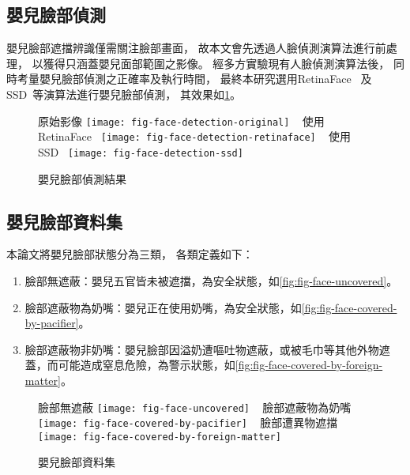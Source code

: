 \documentclass[class=NCU_thesis, crop=false]{standalone}
\begin{document}
\subsection{嬰兒臉部偵測}
嬰兒臉部遮擋辨識僅需關注臉部畫面，
故本文會先透過人臉偵測演算法進行前處理，
以獲得只涵蓋嬰兒面部範圍之影像。
經多方實驗現有人臉偵測演算法後，
同時考量嬰兒臉部偵測之正確率及執行時間，
最終本研究選用RetinaFace~\cite{deng_retinaface_2020}
及SSD~\cite{ye_face_2021}等演算法進行嬰兒臉部偵測，
其效果如\cref{fig:fig-face-detection}。
\begin{figure}[!hbt]
    \centering
    \subcaptionbox
        {原始影像
        \label{fig:fig-face-detection-original}}
        {\texttt{[image: fig-face-detection-original]}}
    ~
    \subcaptionbox
        {使用RetinaFace~\cite{deng_retinaface_2020}
        \label{fig:fig-face-detection-retinaface}}
        {\texttt{[image: fig-face-detection-retinaface]}}
    ~
    \subcaptionbox
        {使用SSD~\cite{ye_face_2021}
        \label{fig:fig-face-detection-ssd}}
        {\texttt{[image: fig-face-detection-ssd]}}
    \caption{嬰兒臉部偵測結果}
    \label{fig:fig-face-detection}
\end{figure}

\subsection{嬰兒臉部資料集}
本論文將嬰兒臉部狀態分為三類，
各類定義如下：
\begin{enumerate}
    \item 臉部無遮蔽：嬰兒五官皆未被遮擋，為安全狀態，如\cref{fig:fig-face-uncovered}。
    \item 臉部遮蔽物為奶嘴：嬰兒正在使用奶嘴，為安全狀態，如\cref{fig:fig-face-covered-by-pacifier}。
    \item 臉部遮蔽物非奶嘴：嬰兒臉部因溢奶遭嘔吐物遮蔽，或被毛巾等其他外物遮蓋，而可能造成窒息危險，為警示狀態，如\cref{fig:fig-face-covered-by-foreign-matter}。
\end{enumerate}
\begin{figure}[!hbt]
    \centering
    \subcaptionbox
        {臉部無遮蔽
        \label{fig:fig-face-uncovered}}
        {\texttt{[image: fig-face-uncovered]}}
    ~
    \subcaptionbox
        {臉部遮蔽物為奶嘴
        \label{fig:fig-face-covered-by-pacifier}}
        {\texttt{[image: fig-face-covered-by-pacifier]}}
    ~
    \subcaptionbox
        {臉部遭異物遮擋
        \label{fig:fig-face-covered-by-foreign-matter}}
        {\texttt{[image: fig-face-covered-by-foreign-matter]}}
    \caption{嬰兒臉部資料集}
    \label{fig:fig-face-dataset}
\end{figure}
\end{document}
